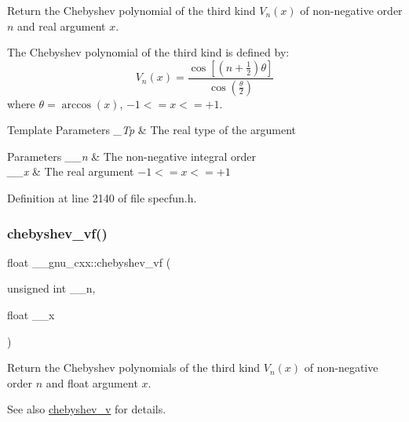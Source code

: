 Return the Chebyshev polynomial of the third kind $ V_n(x) $ of non-\/negative order $ n $ and real argument $ x $.

The Chebyshev polynomial of the third kind is defined by\+: \[ V_n(x) = \frac{\cos \left[ \left(n+\frac{1}{2}\right)\theta \right]} {\cos \left(\frac{\theta}{2}\right)} \] where $ \theta = \arccos(x) $, $ -1 <= x <= +1 $.


\begin{DoxyTemplParams}{Template Parameters}
{\em \+\_\+\+Tp} & The real type of the argument \\
\hline
\end{DoxyTemplParams}

\begin{DoxyParams}{Parameters}
{\em \+\_\+\+\_\+n} & The non-\/negative integral order \\
\hline
{\em \+\_\+\+\_\+x} & The real argument $ -1 <= x <= +1 $ \\
\hline
\end{DoxyParams}


Definition at line 2140 of file specfun.\+h.

\mbox{\label{group__gnu__math__spec__func_gaa9635a0da4bdeaa8060ae5cf03c3a12d}} 
\subsubsection{\texorpdfstring{chebyshev\+\_\+vf()}{chebyshev\_vf()}}
{\footnotesize\ttfamily float \+\_\+\+\_\+gnu\+\_\+cxx\+::chebyshev\+\_\+vf (\begin{DoxyParamCaption}\item[{unsigned int}]{\+\_\+\+\_\+n,  }\item[{float}]{\+\_\+\+\_\+x }\end{DoxyParamCaption})\hspace{0.3cm}{\ttfamily [inline]}}

Return the Chebyshev polynomials of the third kind $ V_n(x) $ of non-\/negative order $ n $ and {\ttfamily float} argument $ x $.

\begin{DoxySeeAlso}{See also}
\hyperlink{group__gnu__math__spec__func_ga32b7decd0002f542d2c9187c5f0846c6}{chebyshev\+\_\+v} for details. 
\end{DoxySeeAlso}


